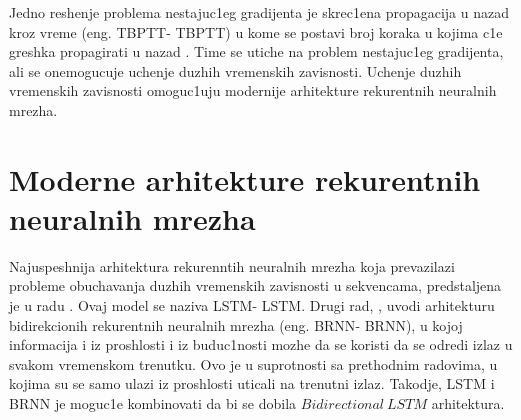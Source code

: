\documentclass[a4paper, openany, oneside, 11pt]{book}
\begin{document}
Jedno reshenje problema nestajuc1eg gradijenta je skrec1ena propagacija u nazad kroz vreme (eng. \acrlong{TBPTT}- \acrshort{TBPTT}) u kome se postavi broj koraka u kojima c1e greshka propagirati u nazad \cite{TBPTT}. Time se utiche na problem nestajuc1eg gradijenta, ali se onemogucuje uchenje duzhih vremenskih zavisnosti. Uchenje duzhih vremenskih zavisnosti omoguc1uju modernije arhitekture rekurentnih neuralnih mrezha.
\section{Moderne arhitekture rekurentnih neuralnih mrezha}
Najuspeshnija arhitektura rekurenntih neuralnih mrezha koja prevazilazi probleme obuchavanja duzhih vremenskih zavisnosti u sekvencama, predstaljena je u radu \cite{LSTM}. Ovaj model se naziva \acrlong{LSTM}- \acrshort{LSTM}. Drugi rad, \cite{BLSTM}, uvodi arhitekturu bidirekcionih rekurentnih neuralnih mrezha (eng. \acrlong{BRNN}- \acrshort{BRNN}), u kojoj informacija i iz proshlosti i iz buduc1nosti mozhe da se koristi da se odredi izlaz u svakom vremenskom trenutku. Ovo je u suprotnosti sa prethodnim radovima, u kojima su se samo ulazi iz proshlosti uticali na trenutni izlaz. Takodje, \acrshort{LSTM} i \acrshort{BRNN} je moguc1e kombinovati da bi se dobila $Bidirectional\ LSTM$ arhitektura.
\end{document}
